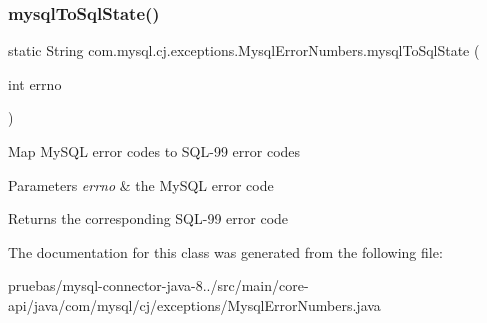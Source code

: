 \subsubsection{\texorpdfstring{mysql\+To\+Sql\+State()}{mysqlToSqlState()}}
{\footnotesize\ttfamily static String com.\+mysql.\+cj.\+exceptions.\+Mysql\+Error\+Numbers.\+mysql\+To\+Sql\+State (\begin{DoxyParamCaption}\item[{int}]{errno }\end{DoxyParamCaption})\hspace{0.3cm}{\ttfamily [static]}}

Map My\+S\+QL error codes to S\+Q\+L-\/99 error codes


\begin{DoxyParams}{Parameters}
{\em errno} & the My\+S\+QL error code\\
\hline
\end{DoxyParams}
\begin{DoxyReturn}{Returns}
the corresponding S\+Q\+L-\/99 error code 
\end{DoxyReturn}


The documentation for this class was generated from the following file\+:\begin{DoxyCompactItemize}
\item 
pruebas/mysql-\/connector-\/java-\/8../src/main/core-\/api/java/com/mysql/cj/exceptions/Mysql\+Error\+Numbers.\+java\end{DoxyCompactItemize}
